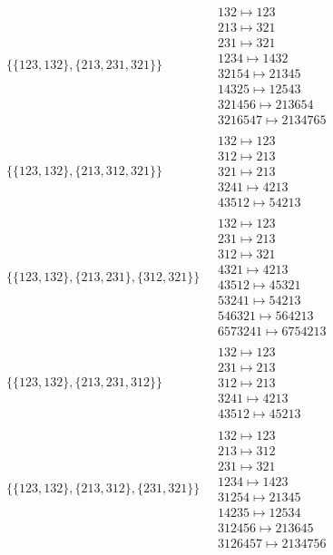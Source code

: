 \begin{scriptsize}
\begin{align}
\begin{matrix}
\end{matrix}
\\
\{\{123, 132\}, \{213, 231, 321\}\}
\ 
&
\begin{matrix}
132 \mapsto 123\\213 \mapsto 321\\231 \mapsto 321\\1234 \mapsto 1432\\32154 \mapsto 21345\\14325 \mapsto 12543\\321456 \mapsto 213654\\3216547 \mapsto 2134765
\end{matrix}
\\
\{\{123, 132\}, \{213, 312, 321\}\}
\ 
&
\begin{matrix}
132 \mapsto 123\\312 \mapsto 213\\321 \mapsto 213\\3241 \mapsto 4213\\43512 \mapsto 54213
\end{matrix}
\\
\{\{123, 132\}, \{213, 231\}, \{312, 321\}\}
\ 
&
\begin{matrix}
132 \mapsto 123\\231 \mapsto 213\\312 \mapsto 321\\4321 \mapsto 4213\\43512 \mapsto 45321\\53241 \mapsto 54213\\546321 \mapsto 564213\\6573241 \mapsto 6754213
\end{matrix}
\\
\{\{123, 132\}, \{213, 231, 312\}\}
\ 
&
\begin{matrix}
132 \mapsto 123\\231 \mapsto 213\\312 \mapsto 213\\3241 \mapsto 4213\\43512 \mapsto 45213
\end{matrix}
\\
\{\{123, 132\}, \{213, 312\}, \{231, 321\}\}
\ 
&
\begin{matrix}
132 \mapsto 123\\213 \mapsto 312\\231 \mapsto 321\\1234 \mapsto 1423\\31254 \mapsto 21345\\14235 \mapsto 12534\\312456 \mapsto 213645\\3126457 \mapsto 2134756

\end{matrix}
\end{align}
\end{scriptsize}
